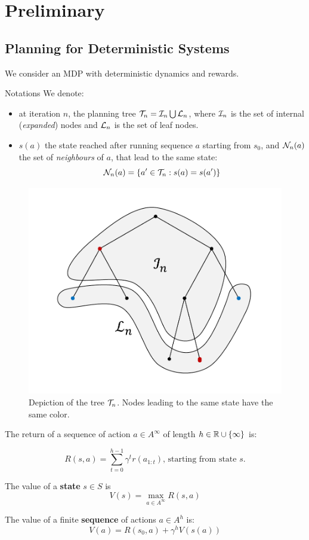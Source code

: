 \documentclass[runningheads]{llncs}
\begin{document}
\section{Preliminary}
\subsection{Planning for Deterministic Systems}

We consider an MDP with deterministic dynamics and rewards.

\begin{paragraph}{Notations}
We denote:
\begin{itemize}
\item at iteration $n$, the planning tree $\mathcal{T}_n = \mathcal{I}_n \bigcup \mathcal{L}_n$, where $\mathcal{I}_n$ is the set of internal (\emph{expanded}) nodes and $\mathcal{L}_n$ is the set of leaf nodes.
\item $s(a)$ the state reached after running sequence $a$ starting from $s_0$, and $\mathcal{N}_n(a)$ the set of \emph{neighbours} of $a$, that lead to the same state:  \[\mathcal{N}_n(a) = \{a'\in\mathcal{T}_n: s(a)=s(a')\}\]
\end{itemize}
\end{paragraph}

\begin{figure}[H]
	\centering
	\includegraphics[trim={1.8cm 1.2cm 1.9cm 1.2cm}, clip,width=0.4\linewidth]{img/tree_1}
	\caption{Depiction of the tree $\mathcal{T}_n$. Nodes leading to the same state have the same color.}
\end{figure}

\begin{definition}[Values]
The return of a sequence of action $a\in A^\infty$ of length $h\in\mathbb{R}\cup\{\infty\}$ is:

\[R(s,a) = \sum_{t=0}^{h-1} \gamma^t r(a_{1:t}) ,\, \text{starting from state $s$.}\]

The value of a \textbf{state} $s\in S$ is
\begin{equation}
    V(s) = \max_{a\in A^\infty} R(s, a)
\end{equation}

The value of a finite \textbf{sequence} of actions $a\in A^h$ is:
\begin{equation}
\label{eq:state_value}
    V(a) = R(s_0,a) + \gamma^{h} V(s(a))
\end{equation}
\end{definition}
\end{document}
